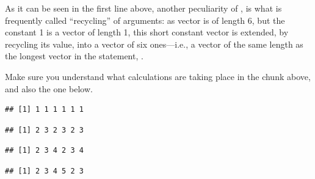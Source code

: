 \documentclass[krantz2]{krantz}\usepackage{knitr}
\begin{document}
As it can be seen in the first line above, another peculiarity of \Rpgrm, is what is frequently called ``recycling'' of arguments: as vector  is of length 6, but the constant 1 is a vector of length 1, this short constant vector is extended, by recycling its value, into a vector of six ones---i.e., a vector of the same length as the longest vector in the statement, .\label{par:recycling:numeric}

Make sure you understand what calculations are taking place in the chunk above, and also the one below.

\begin{knitrout}\footnotesize
{}\color{fgcolor}\begin{kframe}
\begin{alltt}
 \hlkwb{<-} \hlstd{(}\hlstd{,} \hlstd{)}
\end{alltt}
\begin{verbatim}
## [1] 1 1 1 1 1 1
\end{verbatim}
\begin{alltt}
 \hlopt{+} \hlopt{:}
\end{alltt}
\begin{verbatim}
## [1] 2 3 2 3 2 3
\end{verbatim}
\begin{alltt}
 \hlopt{+} \hlopt{:}
\end{alltt}
\begin{verbatim}
## [1] 2 3 4 2 3 4
\end{verbatim}
\begin{alltt}
 \hlopt{+} \hlopt{:}
\end{alltt}


{\ttfamily\noindent\color{warningcolor}{\#\# Warning in a + 1:4: longer object length is not a multiple of shorter object length}}\begin{verbatim}
## [1] 2 3 4 5 2 3
\end{verbatim}
\end{kframe}
\end{knitrout}
\end{document}
